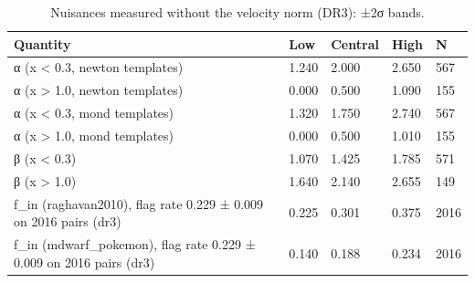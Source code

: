 \begin{table}
\caption{Nuisances measured without the velocity norm (DR3): ±2σ bands.}
\begin{tabular}{lllll}
\toprule
Quantity & Low & Central & High & N \\
\midrule
α (x < 0.3, newton templates) & 1.240 & 2.000 & 2.650 & 567 \\
α (x > 1.0, newton templates) & 0.000 & 0.500 & 1.090 & 155 \\
α (x < 0.3, mond templates) & 1.320 & 1.750 & 2.740 & 567 \\
α (x > 1.0, mond templates) & 0.000 & 0.500 & 1.010 & 155 \\
β (x < 0.3) & 1.070 & 1.425 & 1.785 & 571 \\
β (x > 1.0) & 1.640 & 2.140 & 2.655 & 149 \\
f\_in (raghavan2010), flag rate 0.229 ± 0.009 on 2016 pairs (dr3) & 0.225 & 0.301 & 0.375 & 2016 \\
f\_in (mdwarf\_pokemon), flag rate 0.229 ± 0.009 on 2016 pairs (dr3) & 0.140 & 0.188 & 0.234 & 2016 \\
\bottomrule
\end{tabular}
\end{table}
